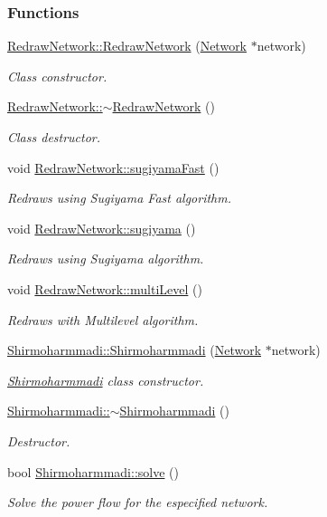 \subsubsection*{Functions}
\begin{DoxyCompactItemize}
\item 
\hyperlink{group___algorithms_ga1fe3edb8c57780eb62f7de8f03dfeda3}{Redraw\+Network\+::\+Redraw\+Network} (\hyperlink{class_network}{Network} $\ast$network)
\begin{DoxyCompactList}\small\item\em Class constructor. \end{DoxyCompactList}\item 
\hyperlink{group___algorithms_gac7b5f7fdb2b88e7d8bb580834e93b1e8}{Redraw\+Network\+::$\sim$\+Redraw\+Network} ()
\begin{DoxyCompactList}\small\item\em Class destructor. \end{DoxyCompactList}\item 
void \hyperlink{group___algorithms_ga94d53ddf8ee00c4ef6d56bb988333103}{Redraw\+Network\+::sugiyama\+Fast} ()
\begin{DoxyCompactList}\small\item\em Redraws using Sugiyama Fast algorithm. \end{DoxyCompactList}\item 
void \hyperlink{group___algorithms_gaee0ae606982145e66bba825421d610f8}{Redraw\+Network\+::sugiyama} ()
\begin{DoxyCompactList}\small\item\em Redraws using Sugiyama algorithm. \end{DoxyCompactList}\item 
void \hyperlink{group___algorithms_ga56a92ad06ae0198ee60160aa66aa0ce1}{Redraw\+Network\+::multi\+Level} ()
\begin{DoxyCompactList}\small\item\em Redraws with Multilevel algorithm. \end{DoxyCompactList}\item 
\hyperlink{group___algorithms_gaa5833386f9b43019a318c81a3006e2b1}{Shirmoharmmadi\+::\+Shirmoharmmadi} (\hyperlink{class_network}{Network} $\ast$network)
\begin{DoxyCompactList}\small\item\em \hyperlink{class_shirmoharmmadi}{Shirmoharmmadi} class constructor. \end{DoxyCompactList}\item 
\hyperlink{group___algorithms_gac89016d70d3c99339af11f3b6f1f23b2}{Shirmoharmmadi\+::$\sim$\+Shirmoharmmadi} ()
\begin{DoxyCompactList}\small\item\em Destructor. \end{DoxyCompactList}\item 
bool \hyperlink{group___algorithms_gacb4a06c62b5d97c25bea70acd477e715}{Shirmoharmmadi\+::solve} ()
\begin{DoxyCompactList}\small\item\em Solve the power flow for the especified network. \end{DoxyCompactList}\end{DoxyCompactItemize}


